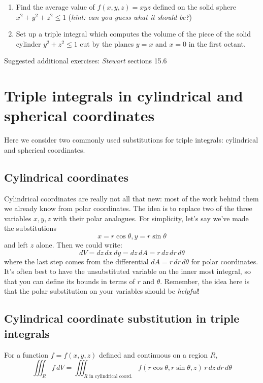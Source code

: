 \documentclass[12pt]{article}
\numberwithin{equation}{subsection}
\numberwithin{figure}{subsection}
\theoremstyle{note}
\begin{document}
{\begin{enumerate}[label=\arabic*.]
\item Find the average value of $f(x,y,z)=xyz$ defined on the solid sphere $x^2+y^2+z^2\leq 1$ (\textit{hint: can you guess what it should be?})

\item Set up a triple integral which computes the volume of the piece of the solid cylinder $y^2+z^2\leq 1$ cut by the planes $y=x$ and $x=0$ in the first octant. 
\end{enumerate}

Suggested additional exercises: \textit{Stewart} sections 15.6

\section[Cylindrical and spherical coordinates]{Triple integrals in cylindrical and spherical coordinates}

Here we consider two commonly used substitutions for triple integrals: cylindrical and spherical coordinates.

\subsection{Cylindrical coordinates}
Cylindrical coordinates are really not all that new: most of the work behind them we already know from polar coordinates. The idea is to replace two of the three variables $x,y,z$ with their polar analogues. For simplicity, let's say we've made the substitutions \[ x=r\cos \theta, y=r\sin \theta\] and left $z$ alone. Then we could write: \begin{equation} \label{cyl-sub} dV=dz \,dx\,dy=dz\, dA=r \,dz \,dr\,d\theta\end{equation} 
where the last step comes from the differential $dA=r \,dr\,d\theta$ for polar coordinates. It's often best to have the unsubstituted variable on the inner most integral, so that you can define its bounds in terms of $r$ and $\theta$. Remember, the idea here is that the polar substitution on your variables should be \textit{helpful}!

\subsection{Cylindrical coordinate substitution in triple integrals} For a function $f=f(x,y,z)$ defined and continuous on a region $R$, \begin{equation}\iiint_R f\,dV=\iiint_{\text{$R$ in cylindrical coord.}} f(r\cos\theta,r\sin\theta,z)\, r \,dz  \,dr \, d\theta \end{equation}

}
\end{document}
